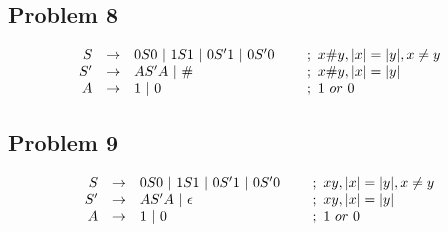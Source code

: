 \documentclass[12pt]
{article}
\newcommand\mygrammar[1]{
$$
\begin{array}{rcll}
#1
\end{array}
$$
}
\newcommand\gr[3]{\ensuremath{{\mit #1} &\rightarrow& #2 & ~~~~;~#3} \\}
\def\por{~|~}
\def\mt{\mathtt}
\def\h{\ensuremath{\mt{\#}}}
\begin{document}
\subsection*{Problem 8}

\mygrammar{
  \gr{S}{0S0 \por 1S1 \por 0S'1 \por 0S'0}{x\h y, |x| = |y|, x \neq y}
  \gr{S'}{AS'A \por \h}{x\h y, |x| = |y|}
  \gr{A}{1 \por 0}{1 ~or~ 0}

}


\subsection*{Problem 9}

\mygrammar{
  \gr{S}{0S0 \por 1S1 \por 0S'1 \por 0S'0}{xy, |x| = |y|, x \neq y}
  \gr{S'}{AS'A \por \epsilon}{xy, |x| = |y|}
  \gr{A}{1 \por 0}{1 ~or~ 0}

}
\end{document}
